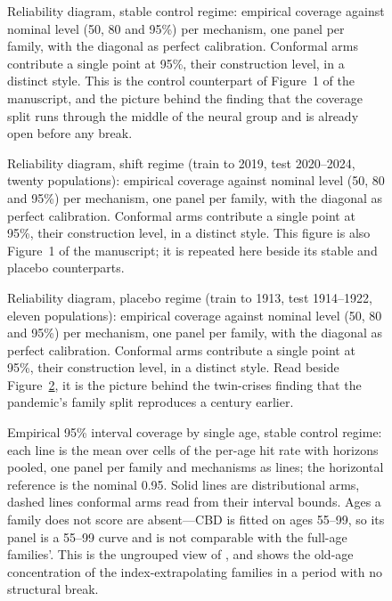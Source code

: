 \begin{figure}[htbp]\centering
{}
\caption{Reliability diagram, stable control regime: empirical coverage against
nominal level (50, 80 and 95\%) per mechanism, one panel per family, with the
diagonal as perfect calibration. Conformal arms contribute a single point at
95\%, their construction level, in a distinct style. This is the control
counterpart of Figure~1 of the manuscript, and the picture behind the finding
that the coverage split runs through the middle of the neural group and is
already open before any break.}
\label{fig:reliability-stable}
\end{figure}
\clearpage

\begin{figure}[htbp]\centering
{}
\caption{Reliability diagram, shift regime (train to 2019, test 2020--2024,
twenty populations): empirical coverage against nominal level (50, 80 and
95\%) per mechanism, one panel per family, with the diagonal as perfect
calibration. Conformal arms contribute a single point at 95\%, their
construction level, in a distinct style. This figure is also Figure~1 of the
manuscript; it is repeated here beside its stable and placebo counterparts.}
\label{fig:reliability-shift}
\end{figure}
\clearpage

\begin{figure}[htbp]\centering
{}
\caption{Reliability diagram, placebo regime (train to 1913, test 1914--1922,
eleven populations): empirical coverage against nominal level (50, 80 and
95\%) per mechanism, one panel per family, with the diagonal as perfect
calibration. Conformal arms contribute a single point at 95\%, their
construction level, in a distinct style. Read beside
Figure~\ref{fig:reliability-shift}, it is the picture behind the twin-crises
finding that the pandemic's family split reproduces a century earlier.}
\label{fig:reliability-placebo}
\end{figure}
\clearpage

\begin{figure}[htbp]\centering
{}
\caption{Empirical 95\% interval coverage by single age, stable control regime:
each line is the mean over cells of the per-age hit rate with horizons pooled,
one panel per family and mechanisms as lines; the horizontal reference is the
nominal 0.95. Solid lines are distributional arms, dashed lines conformal arms
read from their interval bounds. Ages a family does not score are absent---CBD
is fitted on ages 55--99, so its panel is a 55--99 curve and is not comparable
with the full-age families'. This is the ungrouped view of \Hfour, and shows
the old-age concentration of the index-extrapolating families in a period with
no structural break.}
\label{fig:coverage-by-age-stable}
\end{figure}
\clearpage

